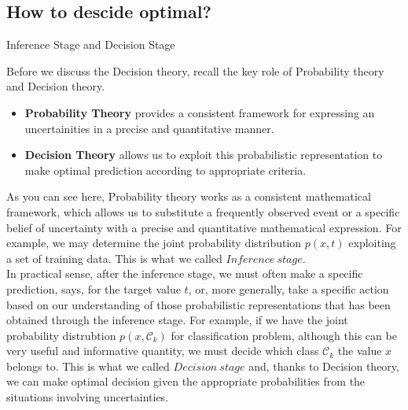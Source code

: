 \documentclass{bredelebeamer}
\begin{document}
\subsection{How to descide optimal?}
\begin{frame}{Inference Stage and Decision Stage}
  \begin{justify}
    Before we discuss the Decision theory, recall the key role of Probability theory
    and Decision theory.
    \begin{itemize}
      \item \begin{justify}
        \textbf{Probability Theory}
        provides a consistent framework for expressing an uncertainities in a
        precise and quantitative manner.
      \end{justify}
      \item\begin{justify}
        \textbf{Decision Theory}
        allows us to exploit this probabilistic representation to make optimal
        prediction according to appropriate criteria.
      \end{justify}
    \end{itemize}
    As you can see here, Probability theory works as a consistent mathematical framework,
    which allows us to substitute a frequently observed event or a specific belief
    of uncertainty with a precise and quantitative mathematical expression. For
    example, we may determine the joint probability distribution $p(x,t)$ exploiting
    a set of training data. This is what we called $\mathit{Inference\ stage}$.\\
    \vspace{0.5\baselineskip}
    In practical sense, after the inference stage, we must often make a specific
    prediction, says, for the target value $t$, or, more generally, take a specific
    action based on our understanding of those probabilistic representations that
    has been obtained through the inference stage. For example, if we have the
    joint probability distrubtion $p(x,\mathcal{C}_k)$ for classification problem,
    although this can be very useful and informative quantity, we must decide which
    class $\mathcal{C}_k$ the value $x$ belongs to. This is what we called
    $\mathit{Decision\ stage}$ and, thanks to Decision theory, we can make optimal
    decision given the appropriate probabilities from the situations involving
    uncertainties.
  \end{justify}
\end{frame}
\end{document}
